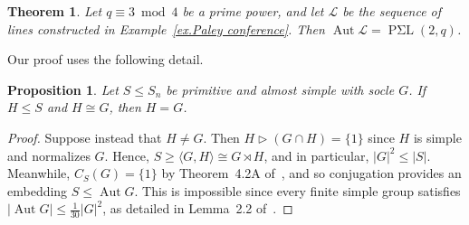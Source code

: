 \documentclass[11pt]{article}
\newtheorem{proposition}[theo]{Proposition}
\newtheorem{theorem}[theo]{Theorem}
\theoremstyle{definition}
\numberwithin{equation}{section}
\begin{document}
\begin{theorem}
\label{thm: PSL automorphism group}
Let $q\equiv 3 \bmod 4$ be a prime power, and let $\mathscr{L}$ be the sequence of lines constructed in Example~\ref{ex.Paley conference}.
Then $\operatorname{Aut} \mathscr{L} = \operatorname{P\text{$\Sigma$}L}(2,q)$.
\end{theorem}

Our proof uses the following detail.

\begin{proposition}
\label{prop: one copy of socle}
Let $S \leq S_n$ be primitive and almost simple with socle $G$.
If $H \leq S$ and $H \cong G$, then $H = G$.
\end{proposition}

\begin{proof}
Suppose instead that $H \neq G$.
Then $H \triangleright (G \cap H) = \{1\}$ since $H$ is simple and normalizes $G$.
Hence, $S \geq \langle G, H \rangle \cong G \rtimes H$, and in particular, $|G|^2 \leq |S|$.
Meanwhile, $C_S(G) = \{1\}$ by Theorem~4.2A of~\cite{DixonMortimer:96}, and so conjugation provides an embedding $S \leq \operatorname{Aut} G$.
This is impossible since every finite simple group satisfies $|\operatorname{Aut} G| \leq \frac{1}{30} |G|^2$, as detailed in Lemma~2.2 of~\cite{Quick:04}.
\end{proof}
\end{document}
